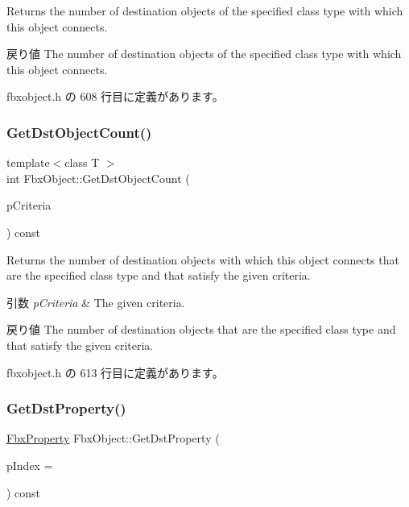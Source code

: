 Returns the number of destination objects of the specified class type with which this object connects. \begin{DoxyReturn}{戻り値}
The number of destination objects of the specified class type with which this object connects. 
\end{DoxyReturn}


 fbxobject.\+h の 608 行目に定義があります。

\mbox{\label{class_fbx_object_a03da9b6768a234550042e0b3a70f081f}} 
\subsubsection{\texorpdfstring{Get\+Dst\+Object\+Count()}{GetDstObjectCount()}\hspace{0.1cm}{\footnotesize\ttfamily [4/4]}}
{\footnotesize\ttfamily template$<$class T $>$ \\
int Fbx\+Object\+::\+Get\+Dst\+Object\+Count (\begin{DoxyParamCaption}\item[{const \hyperlink{class_fbx_criteria}{Fbx\+Criteria} \&}]{p\+Criteria }\end{DoxyParamCaption}) const\hspace{0.3cm}{\ttfamily [inline]}}

Returns the number of destination objects with which this object connects that are the specified class type and that satisfy the given criteria. 
\begin{DoxyParams}{引数}
{\em p\+Criteria} & The given criteria. \\
\hline
\end{DoxyParams}
\begin{DoxyReturn}{戻り値}
The number of destination objects that are the specified class type and that satisfy the given criteria. 
\end{DoxyReturn}


 fbxobject.\+h の 613 行目に定義があります。

\mbox{\label{class_fbx_object_aaec1374d8a9a02429ae4eb317438856d}} 
\subsubsection{\texorpdfstring{Get\+Dst\+Property()}{GetDstProperty()}}
{\footnotesize\ttfamily \hyperlink{class_fbx_property}{Fbx\+Property} Fbx\+Object\+::\+Get\+Dst\+Property (\begin{DoxyParamCaption}\item[{int}]{p\+Index = {} }\end{DoxyParamCaption}) const\hspace{0.3cm}{\ttfamily [inline]}}


